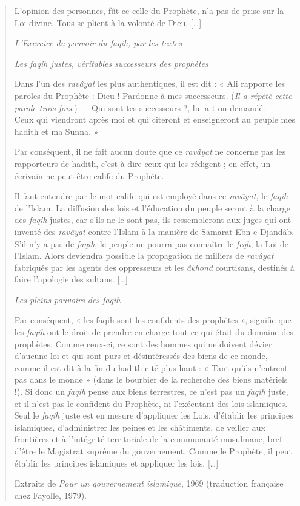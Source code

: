 \begin{quote}
L'opinion des personnes, fût-ce celle du Prophète, n'a pas de prise sur
la Loi divine. Tous se plient à la volonté de Dieu. {[}\ldots{]}

\emph{L'Exercice du pouvoir du faqih, par les textes}

\emph{Les faqih justes, véritables successeurs des prophètes}

Dans l'un des \emph{ravâyat} les plus authentiques, il est dit : « Ali
rapporte les paroles du Prophète : Dieu ! Pardonne à mes successeurs.
(\emph{Il a répété cette parole trois fois}.) --- Qui sont tes
successeurs ?, lui a-t-on demandé. --- Ceux qui viendront après moi et
qui citeront et enseigneront au peuple mes hadith et ma Sunna. »

Par conséquent, il ne fait aucun doute que ce \emph{ravâyat} ne concerne
pas les rapporteurs de hadith, c'est-à-dire ceux qui les rédigent ; en
effet, un écrivain ne peut être calife du Prophète.

Il faut entendre par le mot calife qui est employé dans ce
\emph{ravâyat}, le \emph{faqih} de l'Islam. La diffusion des lois et
l'éducation du peuple seront à la charge des \emph{faqih} justes, car
s'ils ne le sont pas, ils ressembleront aux juges qui ont inventé des
\emph{ravâyat} contre l'Islam à la manière de Samarat Ebn-e-Djandâb.
S'il n'y a pas de \emph{faqih}, le peuple ne pourra pas connaître le
\emph{feqh}, la Loi de l'Islam. Alors deviendra possible la propagation
de milliers de \emph{ravâyat} fabriqués par les agents des oppresseurs
et les \emph{âkhond} courtisans, destinés à faire l'apologie des
sultans. {[}\ldots{]}

\emph{Les pleins pouvoirs des faqih}

Par conséquent, « les faqih sont les confidents des prophètes »,
signifie que les \emph{faqih} ont le droit de prendre en charge tout ce
qui était du domaine des prophètes. Comme ceux-ci, ce sont des hommes
qui ne doivent dévier d'aucune loi et qui sont purs et désintéressés des
biens de ce monde, comme il est dit à la fin du hadith cité plus haut :
« Tant qu'ils n'entrent pas dans le monde » (dans le bourbier de la
recherche des biens matériels !). Si donc un \emph{faqih} pense aux
biens terrestres, ce n'est pas un \emph{faqih} juste, et il n'est pas le
confident du Prophète, ni l'exécutant des lois islamiques. Seul le
\emph{faqih} juste est en mesure d'appliquer les Lois, d'établir les
principes islamiques, d'administrer les peines et les châtiments, de
veiller aux frontières et à l'intégrité territoriale de la communauté
musulmane, bref d'être le Magistrat suprême du gouvernement. Comme le
Prophète, il peut établir les principes islamiques et appliquer les
lois. {[}\ldots{]}

Extraits de \emph{Pour un gouvernement islamique}, 1969 (traduction
française chez Fayolle, 1979).
\end{quote}

